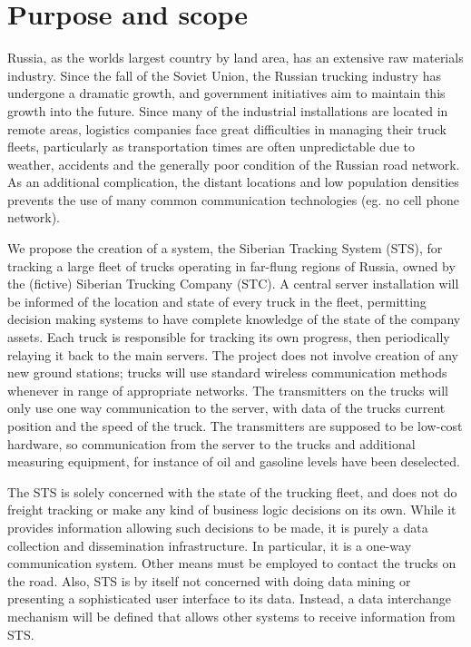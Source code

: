 \documentclass[a4paper,11pt]{report}
\begin{document}
\section{Purpose and scope}
\label{sec:purpose-scope}

Russia, as the worlds largest country by land area, has an extensive
raw materials industry.  Since the fall of the Soviet Union, the
Russian trucking industry has undergone a dramatic growth, and
government initiatives aim to maintain this growth into the future.
Since many of the industrial installations are located in remote
areas, logistics companies face great difficulties in managing their
truck fleets, particularly as transportation times are often
unpredictable due to weather, accidents and the generally poor
condition of the Russian road network.  As an additional complication,
the distant locations and low population densities prevents the use of
many common communication technologies (eg. no cell phone network).

We propose the creation of a system, the Siberian Tracking System
(STS), for tracking a large fleet of trucks operating in far-flung
regions of Russia, owned by the (fictive) Siberian Trucking Company
(STC).  A central server installation will be informed of the location
and state of every truck in the fleet, permitting decision making
systems to have complete knowledge of the state of the company assets.
Each truck is responsible for tracking its own progress, then
periodically relaying it back to the main servers.  The project does
not involve creation of any new ground stations; trucks will use
standard wireless communication methods whenever in range of
appropriate networks. The transmitters on the trucks will only use one way communication to the server, with data of the trucks current position and the speed of the truck. The transmitters are supposed to be low-cost hardware, so communication from the server to the trucks and additional measuring equipment, for instance of oil and gasoline levels have been deselected. 

The STS is solely concerned with the state of the trucking fleet, and
does not do freight tracking or make any kind of business logic
decisions on its own.  While it provides information allowing such
decisions to be made, it is purely a data collection and dissemination
infrastructure.  In particular, it is a one-way communication system.
Other means must be employed to contact the trucks on the road.  Also,
STS is by itself not concerned with doing data mining or presenting a
sophisticated user interface to its data.  Instead, a data interchange
mechanism will be defined that allows other systems to receive
information from STS.
\end{document}
